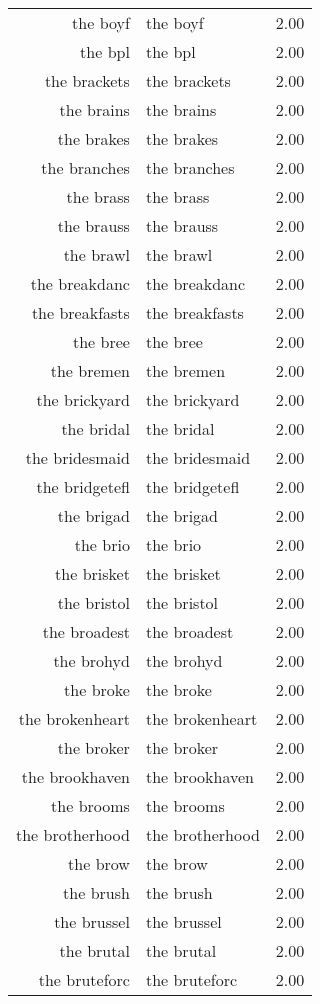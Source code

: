 \begin{table}[ht]
\begin{tabular}{rlr}
  the boyf & the boyf & 2.00 \\ 
  the bpl & the bpl & 2.00 \\ 
  the brackets & the brackets & 2.00 \\ 
  the brains & the brains & 2.00 \\ 
  the brakes & the brakes & 2.00 \\ 
  the branches & the branches & 2.00 \\ 
  the brass & the brass & 2.00 \\ 
  the brauss & the brauss & 2.00 \\ 
  the brawl & the brawl & 2.00 \\ 
  the breakdanc & the breakdanc & 2.00 \\ 
  the breakfasts & the breakfasts & 2.00 \\ 
  the bree & the bree & 2.00 \\ 
  the bremen & the bremen & 2.00 \\ 
  the brickyard & the brickyard & 2.00 \\ 
  the bridal & the bridal & 2.00 \\ 
  the bridesmaid & the bridesmaid & 2.00 \\ 
  the bridgetefl & the bridgetefl & 2.00 \\ 
  the brigad & the brigad & 2.00 \\ 
  the brio & the brio & 2.00 \\ 
  the brisket & the brisket & 2.00 \\ 
  the bristol & the bristol & 2.00 \\ 
  the broadest & the broadest & 2.00 \\ 
  the brohyd & the brohyd & 2.00 \\ 
  the broke & the broke & 2.00 \\ 
  the brokenheart & the brokenheart & 2.00 \\ 
  the broker & the broker & 2.00 \\ 
  the brookhaven & the brookhaven & 2.00 \\ 
  the brooms & the brooms & 2.00 \\ 
  the brotherhood & the brotherhood & 2.00 \\ 
  the brow & the brow & 2.00 \\ 
  the brush & the brush & 2.00 \\ 
  the brussel & the brussel & 2.00 \\ 
  the brutal & the brutal & 2.00 \\ 
  the bruteforc & the bruteforc & 2.00 \\ 

\end{tabular}
\end{table}
